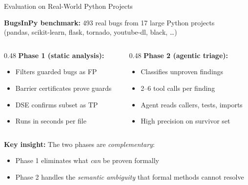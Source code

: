\documentclass[aspectratio=169]{beamer}
\begin{document}
\begin{frame}{Evaluation on Real-World Python Projects}

\textbf{BugsInPy benchmark:} 493 real bugs from 17 large Python projects\\
(pandas, scikit-learn, flask, tornado, youtube-dl, black, \ldots)

\vspace{0.5em}
\begin{columns}[T]
\begin{column}{0.48\textwidth}
\textbf{Phase 1 (static analysis):}
\begin{itemize}
  \item Filters guarded bugs as FP
  \item Barrier certificates prove guards
  \item DSE confirms subset as TP
  \item Runs in seconds per file
\end{itemize}
\end{column}
\begin{column}{0.48\textwidth}
\textbf{Phase 2 (agentic triage):}
\begin{itemize}
  \item Classifies unproven findings
  \item 2--6 tool calls per finding
  \item Agent reads callers, tests, imports
  \item High precision on survivor set
\end{itemize}
\end{column}
\end{columns}

\vspace{0.5em}
\textbf{Key insight:} The two phases are \emph{complementary}:
\begin{itemize}
  \item Phase 1 eliminates what \emph{can} be proven formally
  \item Phase 2 handles the \emph{semantic ambiguity} that formal methods cannot resolve
\end{itemize}

\end{frame}
\end{document}
